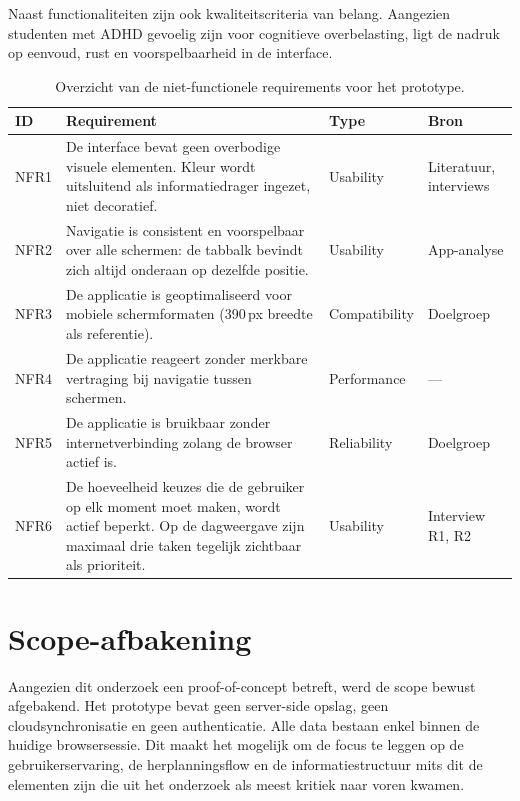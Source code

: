 Naast functionaliteiten zijn ook kwaliteitscriteria van belang. Aangezien
studenten met ADHD gevoelig zijn voor cognitieve overbelasting, ligt de nadruk
op eenvoud, rust en voorspelbaarheid in de interface.

\begin{table}[h]
\centering
\begin{tabular}{|p{1.5cm}|p{9.5cm}|p{2cm}|p{2cm}|}
\hline
\textbf{ID} & \textbf{Requirement} & \textbf{Type} & \textbf{Bron} \\
\hline
NFR1 & De interface bevat geen overbodige visuele elementen. Kleur wordt
uitsluitend als informatiedrager ingezet, niet decoratief. & Usability &
Literatuur, interviews \\
\hline
NFR2 & Navigatie is consistent en voorspelbaar over alle schermen: de
tabbalk bevindt zich altijd onderaan op dezelfde positie. & Usability &
App-analyse \\
\hline
NFR3 & De applicatie is geoptimaliseerd voor mobiele schermformaten
(390\,px breedte als referentie). & Compatibility & Doelgroep \\
\hline
NFR4 & De applicatie reageert zonder merkbare vertraging bij navigatie
tussen schermen. & Performance & — \\
\hline
NFR5 & De applicatie is bruikbaar zonder internetverbinding zolang de
browser actief is. & Reliability & Doelgroep \\
\hline
NFR6 & De hoeveelheid keuzes die de gebruiker op elk moment moet maken,
wordt actief beperkt. Op de dagweergave zijn maximaal drie taken tegelijk
zichtbaar als prioriteit. & Usability & Interview R1, R2 \\
\hline
\end{tabular}
\caption[Niet-functionele requirements]{Overzicht van de niet-functionele
requirements voor het prototype.}
\label{tab:niet-functionele-requirements}
\end{table}

\section{Scope-afbakening}

Aangezien dit onderzoek een proof-of-concept betreft, werd de scope bewust
afgebakend. Het prototype bevat geen server-side opslag, geen cloudsynchronisatie
en geen authenticatie. Alle data bestaan enkel binnen de huidige browsersessie.
Dit maakt het mogelijk om de focus te leggen op de gebruikerservaring,
de herplanningsflow en de informatiestructuur mits dit de elementen zijn die uit het onderzoek
als meest kritiek naar voren kwamen.

